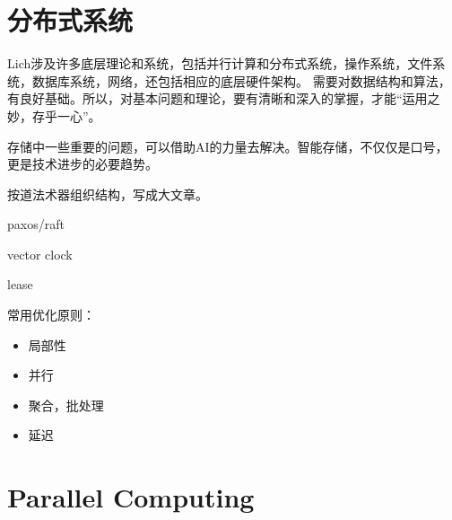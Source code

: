 \chapter{分布式系统}

Lich涉及许多底层理论和系统，包括并行计算和分布式系统，操作系统，文件系统，数据库系统，网络，还包括相应的底层硬件架构。
需要对数据结构和算法，有良好基础。所以，对基本问题和理论，要有清晰和深入的掌握，才能“运用之妙，存乎一心”。

存储中一些重要的问题，可以借助AI的力量去解决。智能存储，不仅仅是口号，更是技术进步的必要趋势。

按道法术器组织结构，写成大文章。

paxos/raft

vector clock

lease

常用优化原则：
\begin{itemize}
    \item 局部性
    \item 并行
    \item 聚合，批处理
    \item 延迟
\end{itemize}

\chapter{Parallel Computing}
